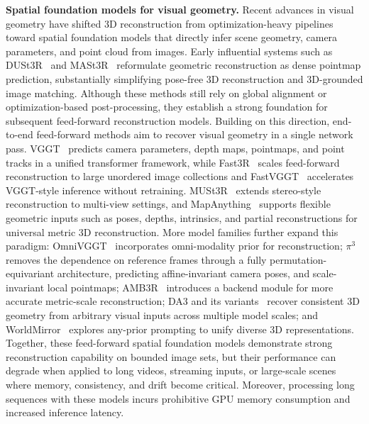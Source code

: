\documentclass{llmxive}
\begin{document}
\textbf{Spatial foundation models for visual geometry.}
Recent advances in visual geometry have shifted 3D reconstruction from optimization-heavy pipelines toward spatial foundation models that directly infer scene geometry, camera parameters, and point cloud from images. 
%
Early influential systems such as DUSt3R~\citep{wang2024dust3r} and MASt3R~\citep{leroy2024mast3r} reformulate geometric reconstruction as dense pointmap prediction, substantially simplifying pose-free 3D reconstruction and 3D-grounded image matching. 
%
Although these methods still rely on global alignment or optimization-based post-processing, they establish a strong foundation for subsequent feed-forward reconstruction models. 
%
Building on this direction, end-to-end feed-forward methods aim to recover visual geometry in a single network pass. 
%
VGGT~\citep{wang2025vggt} predicts camera parameters, depth maps, pointmaps, and point tracks in a unified transformer framework, while Fast3R~\citep{yang2025fast3r} scales feed-forward reconstruction to large unordered image collections and FastVGGT~\citep{shen2025fastvggt} accelerates VGGT-style inference without retraining. 
%
MUSt3R~\citep{cabon2025must3r} extends stereo-style reconstruction to multi-view settings, and MapAnything~\citep{keetha2026mapanything} supports flexible geometric inputs such as poses, depths, intrinsics, and partial reconstructions for universal metric 3D reconstruction. 
%
More model families further expand this paradigm: OmniVGGT~\citep{peng2025omnivggt} incorporates omni-modality prior for reconstruction; $\pi^3$ removes the dependence on reference frames through a fully permutation-equivariant architecture, predicting affine-invariant camera poses, and scale-invariant local pointmaps; AMB3R~\citep{wang2025amb3r} introduces a backend module for more accurate metric-scale reconstruction; DA3 and its variants~\citep{lin2025depth} recover consistent 3D geometry from arbitrary visual inputs across multiple model scales; and WorldMirror~\citep{liu2025worldmirror} explores any-prior prompting to unify diverse 3D representations. 
%
Together, these feed-forward spatial foundation models demonstrate strong reconstruction capability on bounded image sets, but their performance can degrade when applied to long videos, streaming inputs, or large-scale scenes where memory, consistency, and drift become critical.
%
Moreover, processing long sequences with these models incurs prohibitive GPU memory consumption and increased inference latency.
\end{document}
